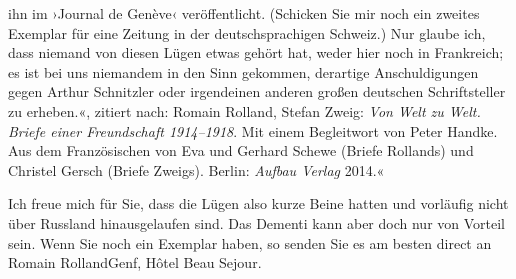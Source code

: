 {{{                     ihn im ›Journal de Genève‹
                     veröffentlicht. (Schicken Sie mir noch ein zweites Exemplar für eine Zeitung in der deutschsprachigen Schweiz.) Nur glaube
                     ich, dass niemand von diesen Lügen etwas gehört hat, weder hier noch in Frankreich; es ist bei uns niemandem in den
                     Sinn gekommen, derartige Anschuldigungen gegen Arthur Schnitzler oder irgendeinen anderen großen deutschen
                     Schriftsteller zu erheben.«, zitiert nach: Romain Rolland, Stefan Zweig: \emph{Von Welt zu Welt. Briefe
                        einer Freundschaft 1914–1918}. Mit einem Begleitwort von Peter
                     Handke. Aus dem Französischen von Eva und Gerhard Schewe (Briefe Rollands) und
                     Christel Gersch (Briefe Zweigs). Berlin: \emph{Aufbau
                        Verlag}{ }2014.}}}\label{K_L03648-1}«\pend
           
\pstart
           Ich freue mich für Sie, dass die Lügen also kurze Beine hatten und vorläufig nicht
               über Russland hinausgelaufen sind. Das Dementi
               kann aber doch nur {\pb}von Vorteil sein.
               Wenn Sie noch ein Exemplar
               haben, so senden Sie es am besten direct an Romain
                  RollandGenf, Hôtel Beau Sejour.\pend
           
